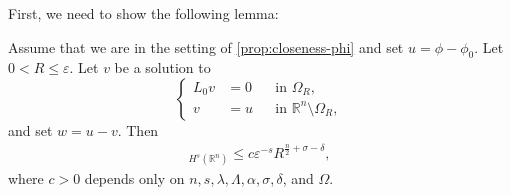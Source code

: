 \documentclass[11pt,reqno]{amsart}
\theoremstyle{plain}
\theoremstyle{definition}
\numberwithin{equation}{section}
\newcommand{\R}{\mathbb{R}}
\newcommand{\eps}{\varepsilon}
\newcommand{\1}{\mathbbm{1}}
\begin{document}
First, we need to show the following lemma:

\begin{lemma}
\label{lemma:closeness-phi-help}
Assume that we are in the setting of \autoref{prop:closeness-phi} and set $u = \phi - \phi_0$. Let $0 < R \le \varepsilon$.  Let $v$ be a solution to
\begin{equation}
\label{eq-v-Sect7}
\left\{
\begin{aligned}
L_{0} v & = 0 &&\text{in }\Omega_R, \\
v & = u &&\text{in } \R^n \setminus \Omega_R,
\end{aligned}
\right.
\end{equation}
and set $w = u-v$. Then
\begin{align*}
    [w]_{H^s(\R^n)}\le c \eps^{-s} R^{\frac{n}{2} + \sigma - \delta},
\end{align*}
where $c > 0$ depends only on $n,s,\lambda,\Lambda,\alpha,\sigma,\delta$, and $\Omega$.
\end{lemma}
\end{document}

